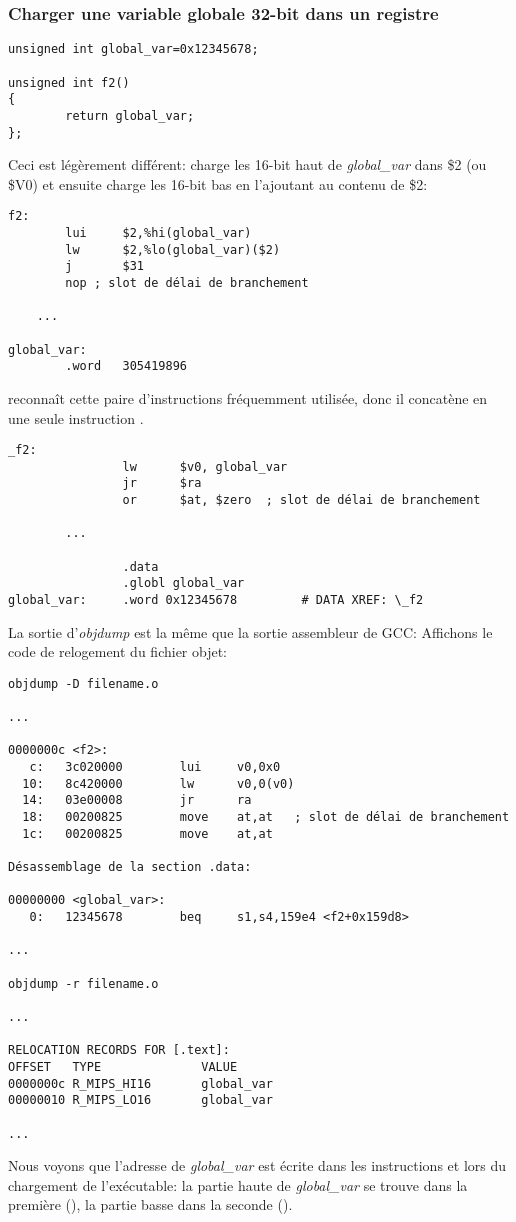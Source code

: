\subsubsection{Charger une variable globale 32-bit dans un registre}

\begin{lstlisting}[style=customc]
unsigned int global_var=0x12345678;

unsigned int f2()
{
        return global_var;
};
\end{lstlisting}


Ceci est légèrement différent:  charge les 16-bit haut de \emph{global\_var}
dans \$2 (ou \$V0) et ensuite  charge les 16-bit bas en l'ajoutant au contenu
de \$2:

\begin{lstlisting}[caption=GCC 4.4.5 -O3 (\assemblyOutput),style=customasmMIPS]
f2:
        lui     $2,%hi(global_var)
        lw      $2,%lo(global_var)($2)
        j       $31
        nop	; slot de délai de branchement

	...

global_var:
        .word   305419896
\end{lstlisting}

\IDA reconnaît cette paire d'instructions fréquemment utilisée, donc il concatène en
une seule instruction .

\begin{lstlisting}[caption=GCC 4.4.5 -O3 (IDA),style=customasmMIPS]
_f2:
                lw      $v0, global_var
                jr      $ra
                or      $at, $zero	; slot de délai de branchement

		...

                .data
                .globl global_var
global_var:     .word 0x12345678         # DATA XREF: \_f2
\end{lstlisting}

La sortie d'\emph{objdump} est la même que la sortie assembleur de GCC:
Affichons le code de relogement du fichier objet:

\begin{lstlisting}[caption=objdump,style=customasmMIPS]
objdump -D filename.o

...

0000000c <f2>:
   c:   3c020000        lui     v0,0x0
  10:   8c420000        lw      v0,0(v0)
  14:   03e00008        jr      ra
  18:   00200825        move    at,at	; slot de délai de branchement
  1c:   00200825        move    at,at

Désassemblage de la section .data:

00000000 <global_var>:
   0:   12345678        beq     s1,s4,159e4 <f2+0x159d8>

...

objdump -r filename.o

...

RELOCATION RECORDS FOR [.text]:
OFFSET   TYPE              VALUE
0000000c R_MIPS_HI16       global_var
00000010 R_MIPS_LO16       global_var

...

\end{lstlisting}

Nous voyons que l'adresse de \emph{global\_var} est écrite dans les instructions 
et  lors du chargement de l'exécutable:
la partie haute de \emph{global\_var} se trouve dans la première (), la partie
basse dans la seconde ().

